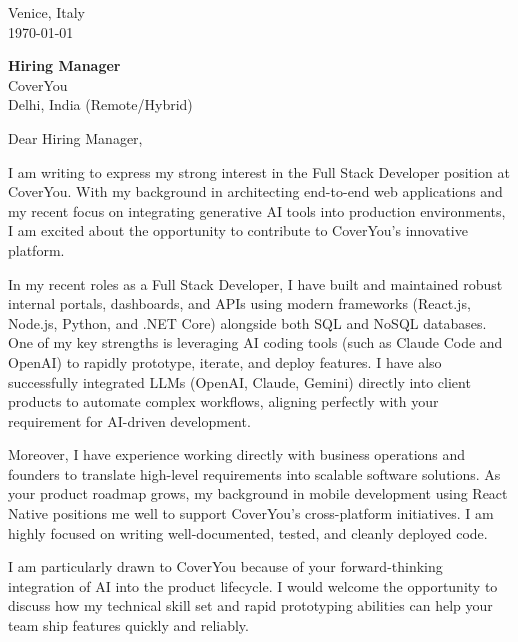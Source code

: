 \documentclass[11pt,a4paper]{article}
\begin{document}
\begin{flushright}
Venice, Italy \\
\today
\end{flushright}

\vspace{2em}

\noindent
\textbf{Hiring Manager} \\
CoverYou \\
Delhi, India (Remote/Hybrid)

\vspace{2em}

\noindent
Dear Hiring Manager,

\vspace{1em}

\noindent
I am writing to express my strong interest in the Full Stack Developer position at CoverYou. With my background in architecting end-to-end web applications and my recent focus on integrating generative AI tools into production environments, I am excited about the opportunity to contribute to CoverYou's innovative platform.

\vspace{1em}

\noindent
In my recent roles as a Full Stack Developer, I have built and maintained robust internal portals, dashboards, and APIs using modern frameworks (React.js, Node.js, Python, and .NET Core) alongside both SQL and NoSQL databases. One of my key strengths is leveraging AI coding tools (such as Claude Code and OpenAI) to rapidly prototype, iterate, and deploy features. I have also successfully integrated LLMs (OpenAI, Claude, Gemini) directly into client products to automate complex workflows, aligning perfectly with your requirement for AI-driven development. 

\vspace{1em}

\noindent
Moreover, I have experience working directly with business operations and founders to translate high-level requirements into scalable software solutions. As your product roadmap grows, my background in mobile development using React Native positions me well to support CoverYou's cross-platform initiatives. I am highly focused on writing well-documented, tested, and cleanly deployed code.

\vspace{1em}

\noindent
I am particularly drawn to CoverYou because of your forward-thinking integration of AI into the product lifecycle. I would welcome the opportunity to discuss how my technical skill set and rapid prototyping abilities can help your team ship features quickly and reliably.
\end{document}
